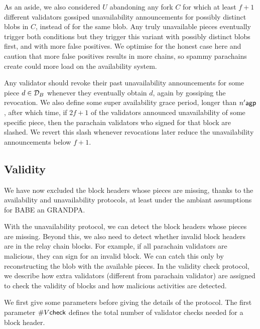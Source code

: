 As an aside, we also considered $U$ abandoning any fork $C$ for which at least $f+1$ different validators gossiped unavailability announcements for possibly distinct blobs in $C$, instead of for the same blob.  Any truly unavailable pieces eventually trigger both conditions but they trigger this variant with possibly distinct blobs first, and with more false positives.  We optimise for the honest case here and caution that more false positives results in more chains, so spammy parachains create could more load on the availability system.

Any validator should revoke their past unavailability announcements for some piece $d \in \mathcal{D}_B$ whenever they eventually obtain $d$, again by gossiping the revocation.  We also define some super availability grace period, longer than $n' \mathsf{agp}$, after which time, if $2 f + 1$ of the validators announced unavailability of some specific piece, then the parachain validators who signed for that block are slashed.
We revert this slash whenever revocations later reduce the unavailability announcements below $f+1$.










\subsection{Validity}
\label{sec:validity}

We have now excluded the block headers whose pieces are missing, thanks to the availability and unavailability protocols, at least under the ambiant assumptions for BABE an GRANDPA.



With the unavailability protocol, we can detect the block headers whose pieces are missing. Beyond this, we also need to detect whether invalid block headers are in the relay chain blocks. For example, if all parachain validators are malicious, they can sign for an invalid block. We can catch this only by reconstructing the blob with the available pieces. In the validity check protocol, we describe how extra validators (different from parachain validator) are assigned to check the validity of blocks and how malicious activities are detected.


We first give some parameters before giving the details of the protocol.
The first parameter $\#V\mathsf{check}$ defines the total number of validator checks needed for a block header.

